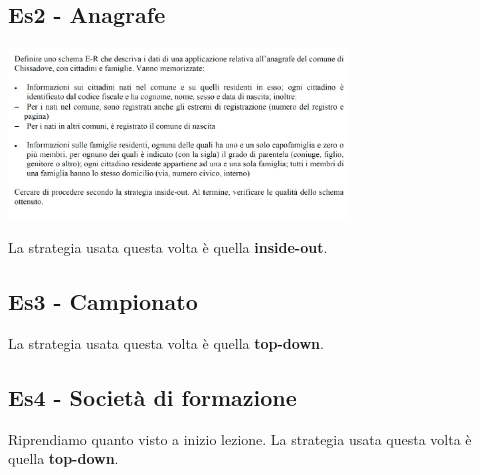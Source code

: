 \subsection{Es2 - Anagrafe}
\begin{center}
    \includegraphics[width=0.675\textwidth]{img/ER_es3anagrafe_specifiche1.jpg}
\end{center}
La strategia usata questa volta è quella \textbf{inside-out}.

\subsection{Es3 - Campionato}
La strategia usata questa volta è quella \textbf{top-down}.

\subsection{Es4 - Società di formazione}
Riprendiamo quanto visto a inizio lezione.
La strategia usata questa volta è quella \textbf{top-down}.